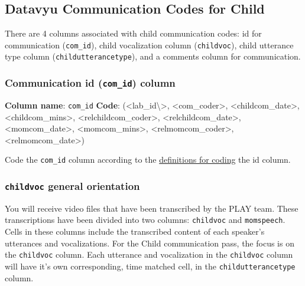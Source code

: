\documentclass[
]{book}
\begin{document}
\hypertarget{datavyu-communication-codes-for-child}{%
\subsection{Datavyu Communication Codes for Child}\label{datavyu-communication-codes-for-child}}

There are 4 columns associated with child communication codes: id for communication (\texttt{com\_id}), child vocalization column (\texttt{childvoc}), child utterance type column (\texttt{childutterancetype}), and a comments column for communication.

\hypertarget{communication-id-com_id-column}{%
\subsubsection*{\texorpdfstring{Communication id (\texttt{com\_id}) column}{Communication id (com\_id) column}}\label{communication-id-com_id-column}}

\textbf{Column name}: \texttt{com\_id}
\textbf{Code}: (\textless lab\_id\textbackslash\textgreater, \textless com\_coder\textgreater, \textless childcom\_date\textgreater, \textless childcom\_mins\textgreater, \textless relchildcom\_coder\textgreater, \textless relchildcom\_date\textgreater, \textless momcom\_date\textgreater, \textless momcom\_mins\textgreater, \textless relmomcom\_coder\textgreater, \textless relmomcom\_date\textgreater)

Code the \texttt{com\_id} column according to the \protect\hyperlink{id_col}{definitions for coding} the id column.

\hypertarget{childvoc-general-orientation}{%
\subsubsection*{\texorpdfstring{\texttt{childvoc} general orientation}{childvoc general orientation}}\label{childvoc-general-orientation}}

You will receive video files that have been transcribed by the PLAY team. These transcriptions have been divided into two columns: \texttt{childvoc} and \texttt{momspeech}. Cells in these columns include the transcribed content of each speaker's utterances and vocalizations. For the Child communication pass, the focus is on the \texttt{childvoc} column. Each utterance and vocalization in the \texttt{childvoc} column will have it's own corresponding, time matched cell, in the \texttt{childutterancetype} column.
\end{document}
